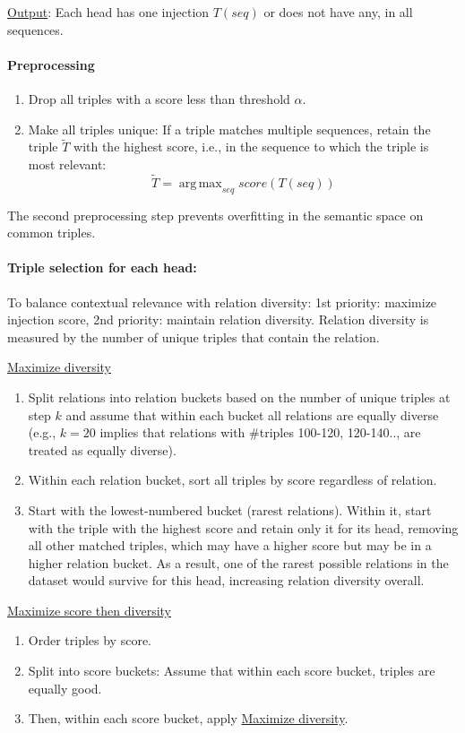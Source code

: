 \documentclass[10pt]{article}
\DeclareMathOperator*{\argmax}{arg\,max}
\begin{document}
\begin{appendices}
\noindent
\underline{Output}: Each head has one injection $T(seq)$ or does not have any, in all sequences.

\paragraph{Preprocessing} 
\begin{enumerate}
    \item Drop all triples with a score less than threshold $\alpha$.
    \item Make all triples unique: If a triple matches multiple sequences, retain the triple $\tilde{T}$ with the highest score, i.e., in the sequence to which the triple is most relevant: 
    $$\tilde{T} = \argmax_{seq} score(T(seq))$$
\end{enumerate}
The second preprocessing step prevents overfitting in the semantic space on common triples.

\paragraph{Triple selection for each head:}
To balance contextual relevance with relation diversity: 1st priority: maximize injection score, 2nd priority: maintain relation diversity. Relation diversity is measured by the number of unique triples that contain the relation.

\underline{Maximize diversity}
\begin{enumerate}
    \item Split relations into relation buckets based on the number of unique triples at step $k$ and assume that within each bucket all relations are equally diverse (e.g., $k=20$ implies that relations with \#triples 100-120, 120-140.., are treated as equally diverse).
    \item Within each relation bucket, sort all triples by score regardless of relation.
    \item Start with the lowest-numbered bucket (rarest relations). Within it, start with the triple with the highest score and retain only it for its head, removing all other matched triples, which may have a higher score but may be in a higher relation bucket. As a result, one of the rarest possible relations in the dataset would survive for this head, increasing relation diversity overall.
\end{enumerate}

\underline{Maximize score then diversity}
\begin{enumerate}
    \item Order triples by score.
    \item Split into score buckets: Assume that within each score bucket, triples are equally good.
    \item Then, within each score bucket, apply \underline{Maximize diversity}.
\end{enumerate}


\end{appendices}
\end{document}
